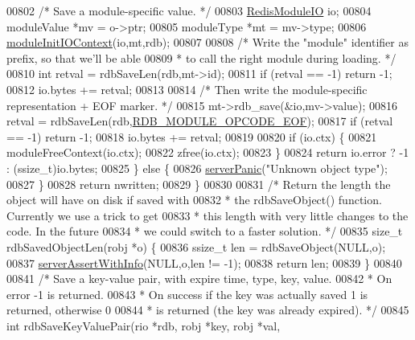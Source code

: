 \begin{DoxyCode}
{{{{{{{{00802         \textcolor{comment}{/* Save a module-specific value. */}
00803         \hyperlink{structRedisModuleIO}{RedisModuleIO} io;
00804         moduleValue *mv = o->ptr;
00805         moduleType *mt = mv->type;
00806         \hyperlink{server_8h_abe94415e34ee463788c4c863dc029908}{moduleInitIOContext}(io,mt,rdb);
00807 
00808         \textcolor{comment}{/* Write the "module" identifier as prefix, so that we'll be able}
00809 \textcolor{comment}{         * to call the right module during loading. */}
00810         \textcolor{keywordtype}{int} retval = rdbSaveLen(rdb,mt->id);
00811         \textcolor{keywordflow}{if} (retval == -1) \textcolor{keywordflow}{return} -1;
00812         io.bytes += retval;
00813 
00814         \textcolor{comment}{/* Then write the module-specific representation + EOF marker. */}
00815         mt->rdb\_save(&io,mv->value);
00816         retval = rdbSaveLen(rdb,\hyperlink{rdb_8h_a905d414d752c18bdea4cf67b498fee52}{RDB\_MODULE\_OPCODE\_EOF});
00817         \textcolor{keywordflow}{if} (retval == -1) \textcolor{keywordflow}{return} -1;
00818         io.bytes += retval;
00819 
00820         \textcolor{keywordflow}{if} (io.ctx) \{
00821             moduleFreeContext(io.ctx);
00822             zfree(io.ctx);
00823         \}
00824         \textcolor{keywordflow}{return} io.error ? -1 : (ssize\_t)io.bytes;
00825     \} \textcolor{keywordflow}{else} \{
00826         \hyperlink{server_8h_a11cc378e7778a830b41240578de3b204}{serverPanic}(\textcolor{stringliteral}{"Unknown object type"});
00827     \}
00828     \textcolor{keywordflow}{return} nwritten;
00829 \}
00830 
00831 \textcolor{comment}{/* Return the length the object will have on disk if saved with}
00832 \textcolor{comment}{ * the rdbSaveObject() function. Currently we use a trick to get}
00833 \textcolor{comment}{ * this length with very little changes to the code. In the future}
00834 \textcolor{comment}{ * we could switch to a faster solution. */}
00835 size\_t rdbSavedObjectLen(robj *o) \{
00836     ssize\_t len = rdbSaveObject(NULL,o);
00837     \hyperlink{server_8h_a7308f76cbff9a8d3797fe78190b91282}{serverAssertWithInfo}(NULL,o,len != -1);
00838     \textcolor{keywordflow}{return} len;
00839 \}
00840 
00841 \textcolor{comment}{/* Save a key-value pair, with expire time, type, key, value.}
00842 \textcolor{comment}{ * On error -1 is returned.}
00843 \textcolor{comment}{ * On success if the key was actually saved 1 is returned, otherwise 0}
00844 \textcolor{comment}{ * is returned (the key was already expired). */}
00845 \textcolor{keywordtype}{int} rdbSaveKeyValuePair(rio *rdb, robj *key, robj *val,
}}}}}}}}
\end{DoxyCode}
